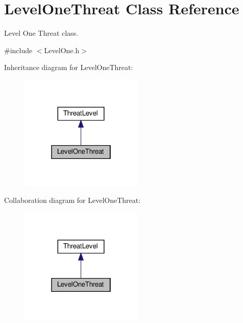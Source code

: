 \hypertarget{classLevelOneThreat}{}\section{Level\+One\+Threat Class Reference}
\label{classLevelOneThreat}


Level One Threat class.  




{\ttfamily \#include $<$Level\+One.\+h$>$}



Inheritance diagram for Level\+One\+Threat\+:\nopagebreak
\begin{figure}[H]
\begin{center}
\leavevmode
\includegraphics[width=166pt]{classLevelOneThreat__inherit__graph}
\end{center}
\end{figure}


Collaboration diagram for Level\+One\+Threat\+:\nopagebreak
\begin{figure}[H]
\begin{center}
\leavevmode
\includegraphics[width=166pt]{classLevelOneThreat__coll__graph}
\end{center}
\end{figure}
